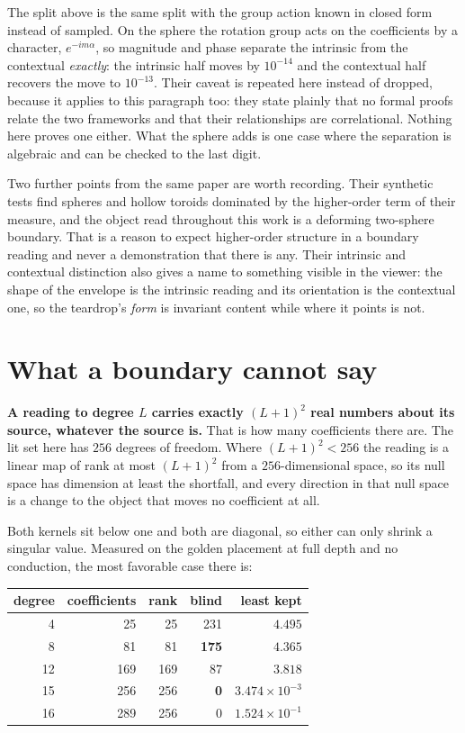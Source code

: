 The split above is the same split with the group action known in closed form instead of sampled. On the sphere the rotation group acts on the coefficients by a character, \(e^{-im\alpha}\), so magnitude and phase separate the intrinsic from the contextual \emph{exactly}: the intrinsic half moves by \(10^{-14}\) and the contextual half recovers the move to \(10^{-13}\). Their caveat is repeated here instead of dropped, because it applies to this paragraph too: they state plainly that no formal proofs relate the two frameworks and that their relationships are correlational. Nothing here proves one either. What the sphere adds is one case where the separation is algebraic and can be checked to the last digit.

Two further points from the same paper are worth recording. Their synthetic tests find spheres and hollow toroids dominated by the higher-order term of their measure, and the object read throughout this work is a deforming two-sphere boundary. That is a reason to expect higher-order structure in a boundary reading and never a demonstration that there is any. Their intrinsic and contextual distinction also gives a name to something visible in the viewer: the shape of the envelope is the intrinsic reading and its orientation is the contextual one, so the teardrop's \emph{form} is invariant content while where it points is not.

\section{What a boundary cannot say}
\label{sec:rank}

\textbf{A reading to degree \(L\) carries exactly \((L+1)^2\) real numbers about its source, whatever the source is.} That is how many coefficients there are. The lit set here has \(256\) degrees of freedom. Where \((L+1)^2 < 256\) the reading is a linear map of rank at most \((L+1)^2\) from a \(256\)-dimensional space, so its null space has dimension at least the shortfall, and every direction in that null space is a change to the object that moves no coefficient at all.

Both kernels sit below one and both are diagonal, so either can only shrink a singular value. Measured on the golden placement at full depth and no conduction, the most favorable case there is:

\begin{center}
\begin{tabular}{rrrrr}
\toprule
degree & coefficients & rank & blind & least kept \\
\midrule
4 & 25 & 25 & 231 & \(4.495\) \\
8 & 81 & 81 & \textbf{175} & \(4.365\) \\
12 & 169 & 169 & 87 & \(3.818\) \\
15 & 256 & 256 & \textbf{0} & \(3.474 \times 10^{-3}\) \\
16 & 289 & 256 & 0 & \(1.524 \times 10^{-1}\) \\
\bottomrule
\end{tabular}
\end{center}

